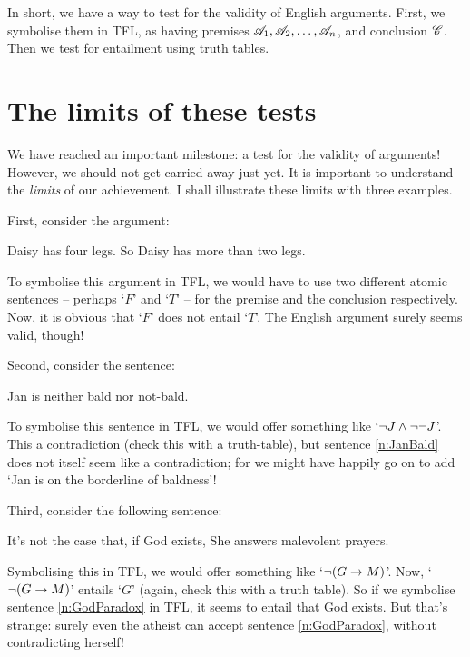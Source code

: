 In short, we have a way to test for the validity of English arguments. First, we symbolise them in TFL, as having premises $\mathscr{A}_1, \mathscr{A}_2, \ldots, \mathscr{A}_n$, and conclusion $\mathscr{C}$. Then we test for entailment using truth tables. 


\section{The limits of these tests}\label{s:ParadoxesOfMaterialConditional}
We have reached an important milestone: a test for the validity of arguments! However, we should not get carried away just yet. It is important to understand the \emph{limits} of our achievement. I shall illustrate these limits with three examples.

First, consider the argument: 
	\begin{earg}
		\item Daisy has four legs. So Daisy has more than two legs.
	\end{earg}
To symbolise this argument in TFL, we would have to use two different atomic sentences -- perhaps `$F$'  and `$T$' -- for the premise and the conclusion respectively. Now, it is obvious that `$F$' does not entail `$T$'. The English argument surely seems valid, though!

Second, consider the sentence:
	\begin{earg}
\setcounter{eargnum}{1}
		\item\label{n:JanBald} Jan is neither bald nor not-bald.
	\end{earg}
To symbolise this sentence in TFL, we would offer something like `$\neg J \wedge \neg \neg J$'. This a contradiction (check this with a truth-table), but sentence \ref{n:JanBald} does not itself seem like a contradiction; for we might have happily go on to add `Jan is on the borderline of baldness'!

Third, consider the following sentence:
	\begin{earg}
\setcounter{eargnum}{2}	
		\item\label{n:GodParadox}	It's not the case that, if God exists, She answers malevolent prayers.
	\end{earg}
Symbolising this in TFL, we would offer something like `$\neg (G \rightarrow M)$'. Now, `$\neg (G \rightarrow M)$' entails `$G$' (again, check this with a truth table). So if we symbolise sentence \ref{n:GodParadox} in TFL, it seems to entail that God exists. But that's strange: surely even the atheist can accept sentence \ref{n:GodParadox}, without contradicting herself!

